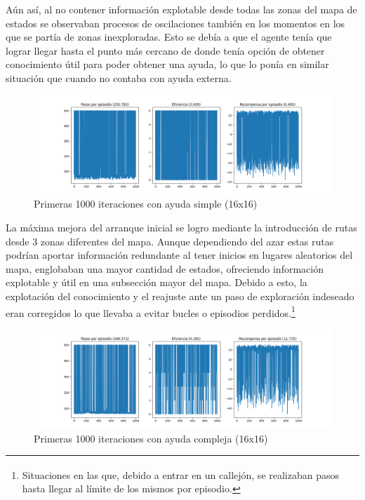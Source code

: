 \documentclass[letterpaper]{article} %
\begin{document}
Aún así, al no contener información explotable desde todas las zonas del mapa de estados se observaban procesos de oscilaciones también en los momentos
 en los que se partía de zonas inexploradas. Esto se debía a que el agente tenía que lograr llegar hasta el punto más cercano de donde tenía opción 
 de obtener conocimiento útil para poder obtener una ayuda, lo que lo ponía en similar situación que cuando no contaba con ayuda externa.

\begin{figure}[H]
    \centering
    \includegraphics[width=0.9\columnwidth]{ayuda_externa_1path.png}
    \caption{Primeras 1000 iteraciones con ayuda simple (16x16)\label{fig:FuN2}}
    
\end{figure}

La máxima mejora del arranque inicial se logro mediante la introducción de rutas desde 3 zonas diferentes del mapa. Aunque dependiendo del azar estas
 rutas podrían aportar información redundante al tener inicios en lugares aleatorios del mapa, englobaban una mayor cantidad de estados, ofreciendo
  información explotable y útil en una subsección mayor del mapa. Debido a esto, la explotación del conocimiento y el reajuste ante un paso de 
  exploración indeseado eran corregidos lo que llevaba a evitar bucles o episodios perdidos.\footnote{\textsuperscript{}Situaciones en las que, 
  debido a entrar en un callejón, se realizaban pasos hasta llegar al límite de los mismos por episodio.}

\begin{figure}[H]
    \centering
    \includegraphics[width=0.9\columnwidth]{ayuda_externa_3paths.png}
    \caption{Primeras 1000 iteraciones con ayuda compleja (16x16)\label{fig:FuN3}}
\end{figure}
\end{document}
